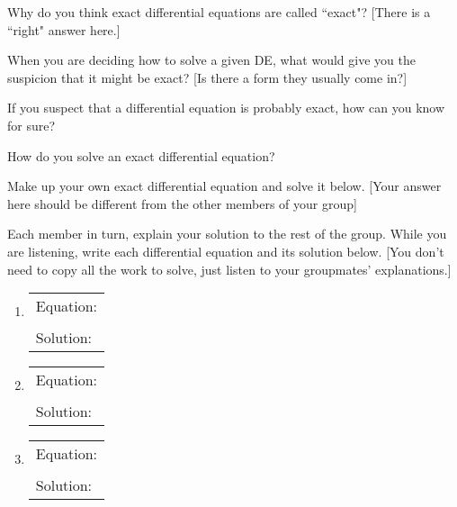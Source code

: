 \documentclass[12pt]{article}
\begin{document}
\begin{enumerate}
  \setcounter{problemnumber}{0}
	\Problem Why do you think exact differential equations are called ``exact"? {\small [There is a ``right" answer here.]}
	
	\vfill

  \Problem When you are deciding how to solve a given DE, what would give you the suspicion that it might be exact? {\small [Is there a form they usually come in?] }
  
  \vfill
  
  \Problem If you suspect that a differential equation is probably exact, how can you know for sure?
  
  \vfill
  
  \Problem How do you solve an exact differential equation? 
  
  \vfill
  
  \pagebreak
  \Problem Make up your own exact differential equation and solve it below. {\small [Your answer here should be different from the other members of your group] } 
  \vfill
  \vfill
  \vfill
  \vfill
  
  \Problem Each member in turn, explain your solution to the rest of the  group. While you are listening, write each differential equation and its solution below. {\small [You don't need to copy all the work to solve, just listen to your groupmates' explanations.] } 
   	\begin{enumerate}[label=\roman*.]
   	\item \mbox{}
   	
   	\begin{tabular}{l}
		Equation:\\
		\\
		Solution:   	
   	\end{tabular}
    \item \mbox{}
   	
   	\begin{tabular}{l}
		Equation:\\
		\\
		Solution:   	
   	\end{tabular}
    \item \mbox{}
   	
   	\begin{tabular}{l}
		Equation:\\
		\\
		Solution:   	
   	\end{tabular}
    
    \end{enumerate}
	\vfill
  
	
\end{enumerate}
\end{document}
